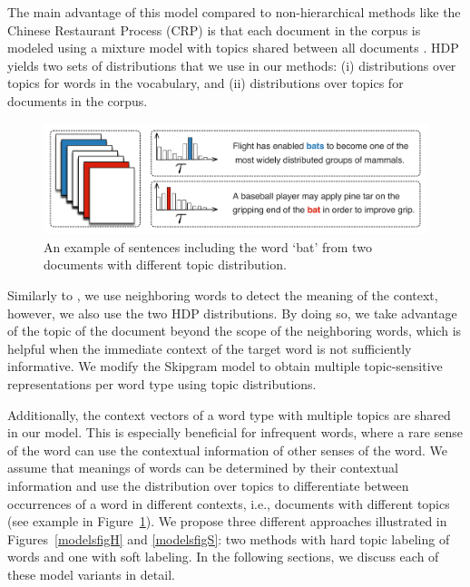 The main advantage of this model compared to non-hierarchical methods like the Chinese Restaurant Process (CRP) is that 
each document in the corpus is modeled using a mixture model with %
topics shared between all documents \citep{citeulike:635668,brody-lapata:2009:EACL}. 
HDP yields two sets of distributions that we use in our methods: (i) distributions over topics for words in the vocabulary, and (ii) distributions over topics for documents in the corpus. 

  \begin{figure}    
  \centering 
  \includegraphics[scale=0.4]{03-research-01/figs/one.pdf} 
  \caption{An example of sentences including the word `bat' from two documents with different topic distribution.}
    \label{modelsfig0}
\end{figure}

Similarly to \citet{neelakantan2014efficient}, we use neighboring words %
to detect the meaning of the context, however,
we also use the two HDP distributions. 
By doing so, we take advantage of the topic of the document beyond the scope of the neighboring words, which is helpful when the immediate context of the target word is not sufficiently informative. 
We modify the Skipgram model \citep{mikolov2013efficient} to obtain multiple topic-sensitive representations per word type using topic distributions.

Additionally, the context vectors of a word type with multiple topics are shared in our model.
This is especially beneficial for infrequent words, where a rare sense of the word can use the contextual information of other senses of the word.
We assume that meanings of words can be determined by their contextual information and use the distribution over topics to differentiate between occurrences of a word in different contexts, i.e., documents with different topics (see example in Figure~\ref{modelsfig0}).
We propose three different approaches illustrated in Figures~\ref{modelsfigH} and \ref{modelsfigS}:
two methods with hard topic labeling of words and one with soft labeling.
In the following sections, we discuss each of these model variants in detail.
  
